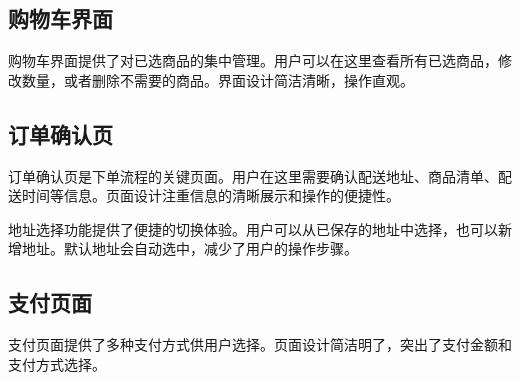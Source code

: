 \documentclass[a4paper,12pt]{article}
\begin{document}
\subsection{购物车界面}

购物车界面提供了对已选商品的集中管理。用户可以在这里查看所有已选商品，修改数量，或者删除不需要的商品。界面设计简洁清晰，操作直观。

\begin{center}
\end{center}

\subsection{订单确认页}

订单确认页是下单流程的关键页面。用户在这里需要确认配送地址、商品清单、配送时间等信息。页面设计注重信息的清晰展示和操作的便捷性。

\begin{center}
\end{center}

地址选择功能提供了便捷的切换体验。用户可以从已保存的地址中选择，也可以新增地址。默认地址会自动选中，减少了用户的操作步骤。

\subsection{支付页面}

支付页面提供了多种支付方式供用户选择。页面设计简洁明了，突出了支付金额和支付方式选择。

\begin{center}
\end{center}
\end{document}
